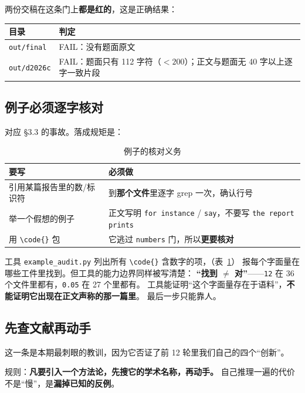 \documentclass[11pt,a4paper]{article}
\newcommand{\code}[1]{\texttt{#1}}
\begin{document}
两份交稿在这条门上\textbf{都是红的}，这是正确结果：

\begin{center}\small
\begin{tabular}{ll}
\toprule
目录 & 判定\\
\midrule
\code{out/final} & FAIL：没有题面原文\\
\code{out/d2026c} & FAIL：题面只有 112 字符（$<200$）；正文与题面无 40 字以上逐字一致片段\\
\bottomrule
\end{tabular}
\end{center}

\subsection{例子必须逐字核对}
对应 §3.3 的事故。落成规矩是：

\begin{table}[tbp]\centering\small
\caption{例子的核对义务}\label{tab:example}
\setlength{\tabcolsep}{4pt}
\begin{tabular}{p{4.4cm}p{8cm}}
\toprule
要写 & 必须做\\
\midrule
引用某篇报告里的数/标识符 & 到\textbf{那个文件}里逐字 grep 一次，确认行号\\
举一个假想的例子 & 正文写明 \code{for instance} / \code{say}，不要写 \code{the report prints}\\
用 \code{\textbackslash code\{\}} 包 & 它逃过 \code{numbers} 门，所以\textbf{更要核对}\\
\bottomrule
\end{tabular}
\end{table}

工具 \code{example\_audit.py} 列出所有 \code{\textbackslash code\{\}} 含数字的项，（表~\ref{tab:example}）
报每个字面量在哪些工件里找到。但工具的能力边界同样被写清楚：
\textbf{“找到 $\ne$ 对”}——\code{12} 在 36 个文件里都有，\code{0.05} 在 27 个里都有。
工具能证明“这个字面量存在于语料”，\textbf{不能证明它出现在正文声称的那一篇里}。
最后一步只能靠人。

\subsection{先查文献再动手}
这一条是本期最刺眼的教训，因为它否证了前 12 轮里我们自己的四个“创新”。

规则：\textbf{凡要引入一个方法论，先搜它的学术名称，再动手。}
自己推理一遍的代价不是“慢”，是\textbf{漏掉已知的反例}。
\end{document}
